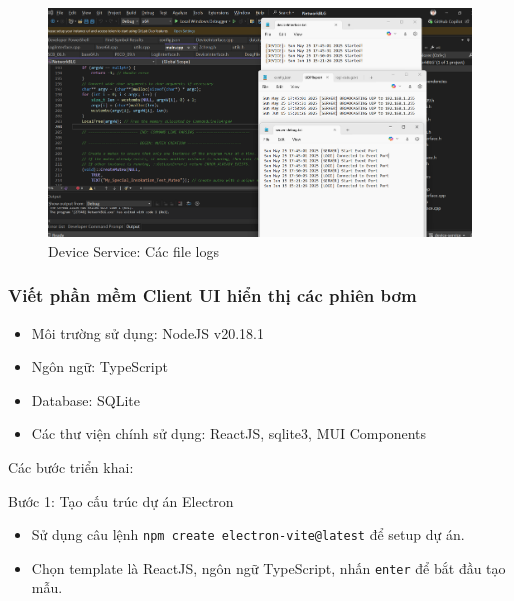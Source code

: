 \begin{figure}[!ht]
     \centering
    \includegraphics[width=1.0\linewidth]{Figures/logs-txt-files-when-start-DeviceService.png}
    \caption{Device Service: Các file logs}
    \label{fig:logs-txt-files-when-start-DeviceService}
\end{figure}
\FloatBarrier








\subsubsection{Viết phần mềm Client UI hiển thị các phiên bơm}



\begin{itemize}
    \item Môi trường sử dụng: NodeJS v20.18.1
    \item Ngôn ngữ: TypeScript 
    \item Database: SQLite 
    \item Các thư viện chính sử dụng: ReactJS, sqlite3, MUI Components
\end{itemize}

Các bước triển khai:

Bước 1: Tạo cấu trúc dự án Electron

\begin{itemize}
    \item Sử dụng câu lệnh \texttt{npm create electron-vite@latest} để setup dự án.
    \item Chọn template là ReactJS, ngôn ngữ TypeScript, nhấn \texttt{enter} để bắt đầu tạo mẫu.
\end{itemize}




